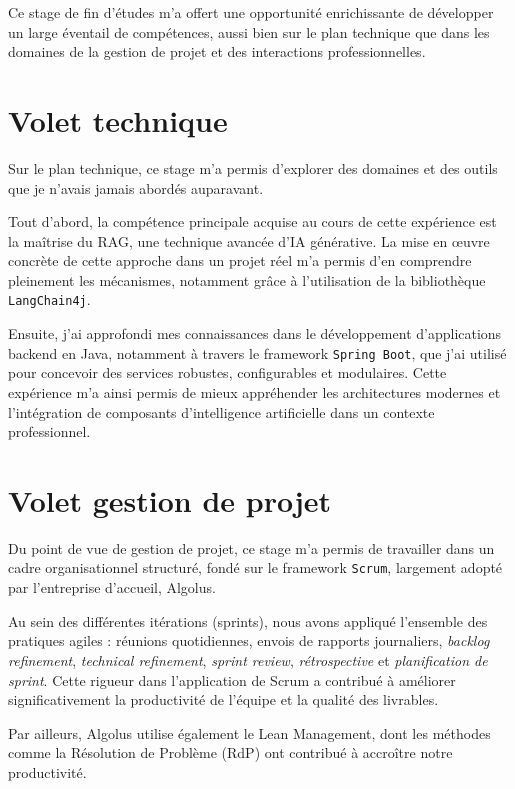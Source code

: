 \documentclass[12pt,a4paper]{report}
\begin{document}
	Ce stage de fin d'études m'a offert une opportunité enrichissante de développer un large éventail de compétences, aussi bien sur le plan technique que dans les domaines de la gestion de projet et des interactions professionnelles.
	
	\section{Volet technique}
	
	Sur le plan technique, ce stage m’a permis d’explorer des domaines et des outils que je n’avais jamais abordés auparavant.
	
	Tout d’abord, la compétence principale acquise au cours de cette expérience est la maîtrise du RAG, une technique avancée d’IA générative. La mise en œuvre concrète de cette approche dans un projet réel m’a permis d’en comprendre pleinement les mécanismes, notamment grâce à l’utilisation de la bibliothèque \texttt{LangChain4j}.
	
	Ensuite, j’ai approfondi mes connaissances dans le développement d’applications backend en Java, notamment à travers le framework \texttt{Spring Boot}, que j’ai utilisé pour concevoir des services robustes, configurables et modulaires. Cette expérience m’a ainsi permis de mieux appréhender les architectures modernes et l’intégration de composants d’intelligence artificielle dans un contexte professionnel.
	
	\section{Volet gestion de projet}
	
	Du point de vue de gestion de projet, ce stage m’a permis de travailler dans un cadre organisationnel structuré, fondé sur le framework \texttt{Scrum}, largement adopté par l’entreprise d’accueil, Algolus.
	
	Au sein des différentes itérations (sprints), nous avons appliqué l’ensemble des pratiques agiles : réunions quotidiennes, envois de rapports journaliers, \textit{backlog refinement}, \textit{technical refinement}, \textit{sprint review}, \textit{rétrospective} et \textit{planification de sprint}. Cette rigueur dans l’application de Scrum a contribué à améliorer significativement la productivité de l’équipe et la qualité des livrables.
	
	Par ailleurs, Algolus utilise également le Lean Management, dont les méthodes comme la Résolution de Problème (RdP) ont contribué à accroître notre productivité.
	
\end{document}
